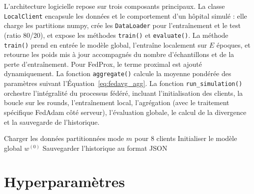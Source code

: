 \documentclass[12pt,a4paper]{report}
\begin{document}
L'architecture logicielle repose sur trois composants principaux. La classe \texttt{LocalClient} encapsule les donn\'{e}es et le comportement d'un h\^{o}pital simul\'{e} : elle charge les partitions numpy, cr\'{e}e les \texttt{DataLoader} pour l'entra\^{i}nement et le test (ratio 80/20), et expose les m\'{e}thodes \texttt{train()} et \texttt{evaluate()}. La m\'{e}thode \texttt{train()} prend en entr\'{e}e le mod\`{e}le global, l'entra\^{i}ne localement sur $E$ \'{e}poques, et retourne les poids mis \`{a} jour accompagn\'{e}s du nombre d'\'{e}chantillons et de la perte d'entra\^{i}nement. Pour FedProx, le terme proximal est ajout\'{e} dynamiquement. La fonction \texttt{aggregate()} calcule la moyenne pond\'{e}r\'{e}e des param\`{e}tres suivant l'\'{E}quation~\ref{eq:fedavg_agg}. La fonction \texttt{run\_simulation()} orchestre l'int\'{e}gralit\'{e} du processus f\'{e}d\'{e}r\'{e}, incluant l'initialisation des clients, la boucle sur les rounds, l'entra\^{i}nement local, l'agr\'{e}gation (avec le traitement sp\'{e}cifique FedAdam c\^{o}t\'{e} serveur), l'\'{e}valuation globale, le calcul de la divergence et la sauvegarde de l'historique.

\begin{algorithm}[H]
\SetAlgoLined
\DontPrintSemicolon
{}
Charger les donn\'{e}es partitionn\'{e}es mode $m$ pour 8 clients\;
Initialiser le mod\`{e}le global $w^{(0)}$\;
Sauvegarder l'historique au format JSON\;
\caption{Boucle f\'{e}d\'{e}r\'{e}e g\'{e}n\'{e}rique --- \texttt{run\_simulation()}}
\label{alg:fl_loop}
\end{algorithm}

\section{Hyperparam\`{e}tres}
\end{document}
